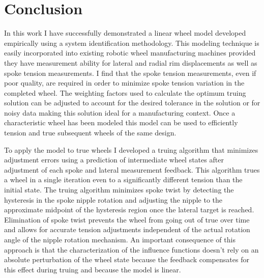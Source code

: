 \documentclass[journal]{IEEEtran}
\begin{document}

\section{Conclusion}
In this work I have successfully demonstrated a linear wheel model developed empirically using a system identification methodology. This modeling technique is easily incorporated into existing robotic wheel manufacturing machines provided they have measurement ability for lateral and radial rim displacements as well as spoke tension measurements. I find that the spoke tension measurements, even if poor quality, are required in order to minimize spoke tension variation in the completed wheel.  The weighting factors used to calculate the optimum truing solution can be adjusted to account for the desired tolerance in the solution or for noisy data making this solution ideal for a manufacturing context. Once a characteristic wheel has been modeled this model can be used to efficiently tension and true subsequent wheels of the same design.

To apply the model to true wheels I developed a truing algorithm that minimizes adjustment errors using a prediction of intermediate wheel states after adjustment of each spoke and lateral measurement feedback. This algorithm trues a wheel in a single iteration even to a significantly different tension than the initial state. The truing algorithm minimizes spoke twist by detecting the hysteresis in the spoke nipple rotation and adjusting the nipple to the approximate midpoint of the hysteresis region once the lateral target is reached. Elimination of spoke twist prevents the wheel from going out of true over time and allows for accurate tension adjustments independent of the actual rotation angle of the nipple rotation mechanism. An important consequence of this approach is that the characterization of the influence functions doesn't rely on an absolute perturbation of the wheel state because the feedback compensates for this effect during truing and because the model is linear.
\end{document}
